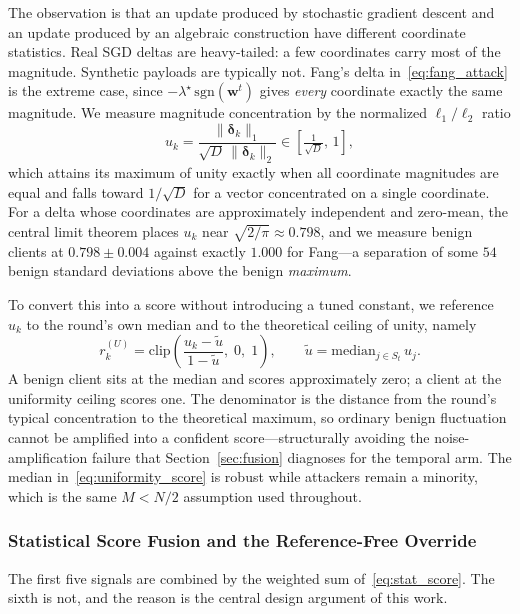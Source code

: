 \documentclass[journal]{IEEEtran}
\begin{document}
The observation is that an update produced by stochastic gradient descent and an update produced by an algebraic construction have different coordinate statistics. Real SGD deltas are heavy-tailed: a few coordinates carry most of the magnitude. Synthetic payloads are typically not. Fang's delta in~\eqref{eq:fang_attack} is the extreme case, since $-\lambda^\star\,\mathrm{sgn}(\mathbf{w}^t)$ gives \emph{every} coordinate exactly the same magnitude. We measure magnitude concentration by the normalized $\ell_1/\ell_2$ ratio
\begin{equation}
u_k = \frac{\bigl\| \boldsymbol{\delta}_k \bigr\|_1}{\sqrt{D}\, \bigl\| \boldsymbol{\delta}_k \bigr\|_2} \in \left[ \tfrac{1}{\sqrt{D}},\, 1 \right],
\label{eq:uniformity}
\end{equation}
which attains its maximum of unity exactly when all coordinate magnitudes are equal and falls toward $1/\sqrt{D}$ for a vector concentrated on a single coordinate. For a delta whose coordinates are approximately independent and zero-mean, the central limit theorem places $u_k$ near $\sqrt{2/\pi} \approx 0.798$, and we measure benign clients at $0.798 \pm 0.004$ against exactly $1.000$ for Fang---a separation of some $54$ benign standard deviations above the benign \emph{maximum}.

To convert this into a score without introducing a tuned constant, we reference $u_k$ to the round's own median and to the theoretical ceiling of unity, namely
\begin{equation}
r_k^{(U)} = \mathrm{clip}\!\left( \frac{u_k - \tilde{u}}{1 - \tilde{u}},\; 0,\; 1 \right), \qquad \tilde{u} = \mathrm{median}_{j \in S_t}\, u_j.
\label{eq:uniformity_score}
\end{equation}
A benign client sits at the median and scores approximately zero; a client at the uniformity ceiling scores one. The denominator is the distance from the round's typical concentration to the theoretical maximum, so ordinary benign fluctuation cannot be amplified into a confident score---structurally avoiding the noise-amplification failure that Section~\ref{sec:fusion} diagnoses for the temporal arm. The median in~\eqref{eq:uniformity_score} is robust while attackers remain a minority, which is the same $M < N/2$ assumption used throughout.

\subsubsection{Statistical Score Fusion and the Reference-Free Override}
\label{sec:reffree}
The first five signals are combined by the weighted sum of~\eqref{eq:stat_score}. The sixth is not, and the reason is the central design argument of this work.
\end{document}
